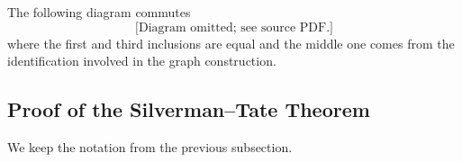 The following diagram  commutes
\begin{equation*}
  \text{[Diagram omitted; see source PDF.]}
\end{equation*}
where the first and third inclusions are equal and the middle one
comes from the identification involved in the graph construction.



\subsection{Proof of the Silverman--Tate Theorem}


We keep the notation from the  previous subsection.


